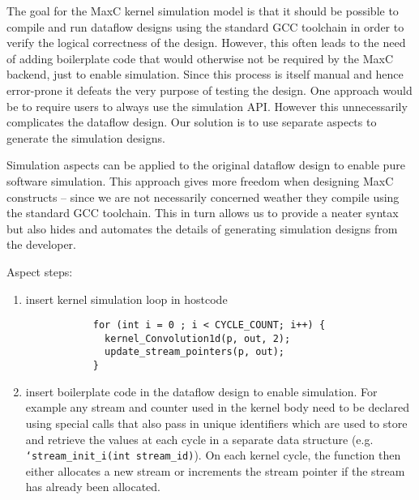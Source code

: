 The goal for the MaxC kernel simulation model is that it should be
possible to compile and run dataflow designs using the standard GCC
toolchain in order to verify the logical correctness of the
design. However, this often leads to the need of adding boilerplate
code that would otherwise not be required by the MaxC backend, just to
enable simulation. Since this process is itself manual and hence
error-prone it defeats the very purpose of testing the design. One
approach would be to require users to always use the simulation
API. However this unnecessarily complicates the dataflow design. Our
solution is to use separate aspects to generate the simulation
designs.

Simulation aspects can be applied to the original dataflow design to
enable pure software simulation. This approach gives more freedom when
designing MaxC constructs -- since we are not necessarily concerned
weather they compile using the standard GCC toolchain. This in turn
allows us to provide a neater syntax but also hides and automates the
details of generating simulation designs from the developer.

Aspect steps:

\begin{enumerate}

\item insert kernel simulation loop in hostcode %
  \begin{figure}[!h]
    \begin{lstlisting}
      for (int i = 0 ; i < CYCLE_COUNT; i++) {
        kernel_Convolution1d(p, out, 2);
        update_stream_pointers(p, out);
      }
    \end{lstlisting}
  \end{figure}

\item insert boilerplate code in the dataflow design to enable simulation.
  For example any stream and counter used in the kernel body need to
  be declared using special calls that also pass in unique identifiers
  which are used to store and retrieve the values at each cycle in a
  separate data structure (e.g. \texttt{`stream\_init\_i(int
    stream\_id)}). On each kernel cycle, the function then either
  allocates a new stream or increments the stream pointer if the
  stream has already been allocated.
  \begin{comment}
    \begin{figure}[!h]
      \begin{lstlisting}
        float* i4 = count_i(1000, 1, 0);
        float* i1 = countChain_i(n1, 1, i4, 0);
      \end{lstlisting}
      \caption{Applying the simulation aspect to the dataflow design in
        Figure \ref{fig:maxc-1dconv}}
      \label{fig:maxc-sim-aspect}
    \end{figure}
  \end{comment}

\end{enumerate}

